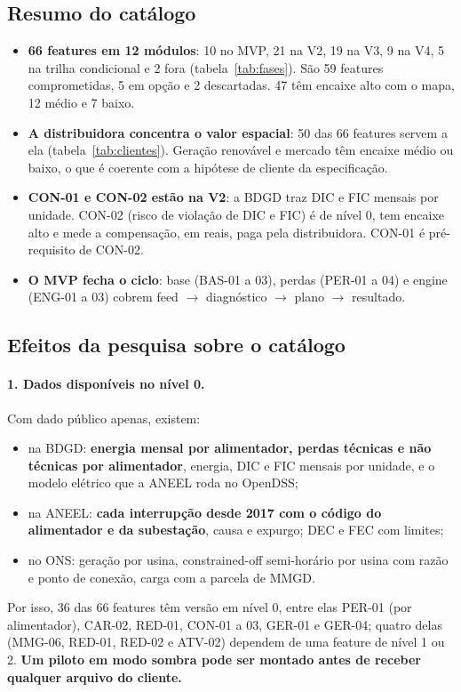 
\subsection*{Resumo do catálogo}

\begin{itemize}
  \item \textbf{66 features em 12 módulos}: 10 no MVP, 21 na V2, 19 na V3, 9
    na V4, 5 na trilha condicional e 2 fora (tabela~\ref{tab:fases}). São 59
    features comprometidas, 5 em opção e 2 descartadas. 47 têm encaixe alto com o mapa, 12
    médio e 7 baixo.
  \item \textbf{A distribuidora concentra o valor espacial}: 50 das 66
    features servem a ela (tabela~\ref{tab:clientes}). Geração renovável e
    mercado têm encaixe médio ou baixo, o que é coerente com a hipótese de cliente
    da especificação.
  \item \textbf{CON-01 e CON-02 estão na V2}: a BDGD traz DIC e FIC mensais
    por unidade. CON-02 (risco de violação de DIC e FIC) é de nível 0, tem
    encaixe alto e mede a compensação, em reais, paga pela distribuidora.
    CON-01 é pré-requisito de CON-02.
  \item \textbf{O MVP fecha o ciclo}: base (BAS-01 a 03), perdas
    (PER-01 a 04) e engine (ENG-01 a 03) cobrem feed $\rightarrow$
    diagnóstico $\rightarrow$ plano $\rightarrow$ resultado.
\end{itemize}

\subsection*{Efeitos da pesquisa sobre o catálogo}

\paragraph{1. Dados disponíveis no nível 0.} Com dado público
apenas, existem:
\begin{itemize}
  \item na BDGD: \textbf{energia mensal por alimentador, perdas técnicas e não
    técnicas por alimentador}, energia, DIC e FIC mensais por unidade, e o
    modelo elétrico que a ANEEL roda no OpenDSS;
  \item na ANEEL: \textbf{cada interrupção desde 2017 com o código do
    alimentador e da subestação}, causa e expurgo; DEC e FEC com limites;
  \item no ONS: geração por usina, constrained-off semi-horário por usina com
    razão e ponto de conexão, carga com a parcela de MMGD.
\end{itemize}
Por isso, 36 das 66 features têm versão em nível 0, entre elas PER-01 (por
alimentador), CAR-02, RED-01, CON-01 a 03, GER-01 e GER-04; quatro delas
(MMG-06, RED-01, RED-02 e ATV-02) dependem de uma feature de nível 1 ou 2. \textbf{Um
piloto em modo sombra pode ser montado antes de receber qualquer arquivo do
cliente.}

